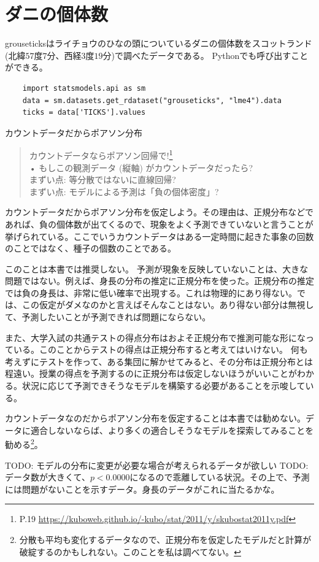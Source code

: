 
\section{ダニの個体数}
grouseticksはライチョウのひなの頭についているダニの個体数をスコットランド(北緯$57$度$7$分、西経$3$度$19$分)で調べたデータである。
Pythonでも呼び出すことができる。

\begin{lstlisting}
    import statsmodels.api as sm
    data = sm.datasets.get_rdataset("grouseticks", "lme4").data
    ticks = data['TICKS'].values
\end{lstlisting}

\begin{SMbox}{カウントデータだからポアソン分布}
    \begin{quote}
        カウントデータならポアソン回帰で!\footnote{P.19 \url{https://kuboweb.github.io/-kubo/stat/2011/y/skubostat2011y.pdf}}\\
        • もしこの観測データ (縦軸) がカウントデータだったら?\\
        まずい点: 等分散ではないに直線回帰?\\
        まずい点: モデルによる予測は「負の個体密度」?\\
    \end{quote}
    カウントデータだからポアソン分布を仮定しよう。その理由は、正規分布などであれば、負の個体数が出てくるので、現象をよく予測できていないと言うことが挙げられている。ここでいうカウントデータはある一定時間に起きた事象の回数のことではなく、種子の個数のことである。

    このことは本書では推奨しない。
    予測が現象を反映していないことは、大きな問題ではない。例えば、身長の分布の推定に正規分布を使った。正規分布の推定では負の身長は、非常に低い確率で出現する。これは物理的にあり得ない。では、この仮定がダメなのかと言えばそんなことはない。あり得ない部分は無視して、予測したいことが予測できれば問題にならない。

    また、大学入試の共通テストの得点分布はおよそ正規分布で推測可能な形になっている。このことからテストの得点は正規分布すると考えてはいけない。
    何も考えずにテストを作って、ある集団に解かせてみると、その分布は正規分布とは程遠い。授業の得点を予測するのに正規分布は仮定しないほうがいいことがわかる。状況に応じて予測できそうなモデルを構築する必要があることを示唆している。

    カウントデータなのだからポアソン分布を仮定することは本書では勧めない。データに適合しないならば、より多くの適合しそうなモデルを探索してみることを勧める\footnote{分散も平均も変化するデータなので、正規分布を仮定したモデルだと計算が破綻するのかもしれない。このことを私は調べてない。}。
    
\end{SMbox}




TODO: モデルの分布に変更が必要な場合が考えられるデータが欲しい
TODO: データ数が大きくて、$p<0.0000$になるので乖離している状況。その上で、予測には問題がないことを示すデータ。身長のデータがこれに当たるかな。
\fi

